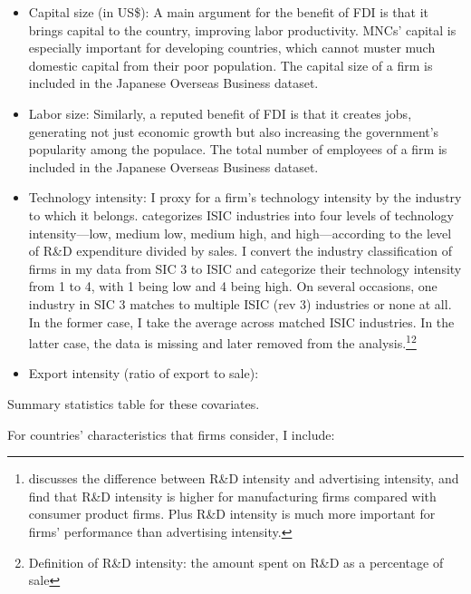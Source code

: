 \begin{itemize}
\item Capital size (in US\$): A main argument for the benefit of FDI is that it brings capital to the country, improving labor productivity. MNCs' capital is especially important for developing countries, which cannot muster much domestic capital from their poor population. The capital size of a firm is included in the Japanese Overseas Business dataset.

\item Labor size: Similarly, a reputed benefit of FDI is that it creates jobs, generating not just economic growth but also increasing the government's popularity among the populace. The total number of employees of a firm is included in the Japanese Overseas Business dataset.

\item Technology intensity: I proxy for a firm's technology intensity by the
  industry to which it belongs. \citet{OECD2009} categorizes ISIC industries
  into four levels of technology intensity---low, medium low, medium high, and
  high---according to the level of R\&D expenditure divided by sales. I convert
  the industry classification of firms in my data from SIC 3 to ISIC and
  categorize their technology intensity from 1 to 4, with 1 being low and 4
  being high. On several occasions, one industry in SIC 3 matches to multiple
  ISIC (rev 3) industries or none at all. In the former case, I take the average
  across matched ISIC industries. In the latter case, the data is missing and
  later removed from the analysis.\footnote{\cite{Bergstrand2007} discusses the
    difference between R\&D intensity and advertising intensity, and find that
    R\&D intensity is higher for manufacturing firms compared with consumer
    product firms. Plus R\&D intensity is much more important for firms'
    performance than advertising intensity.}\footnote{Definition of R\&D
    intensity: the amount spent on R\&D as a percentage of sale}

\item Export intensity (ratio of export to sale):
\end{itemize}

Summary statistics table for these covariates.


For countries' characteristics that firms consider, I include:

